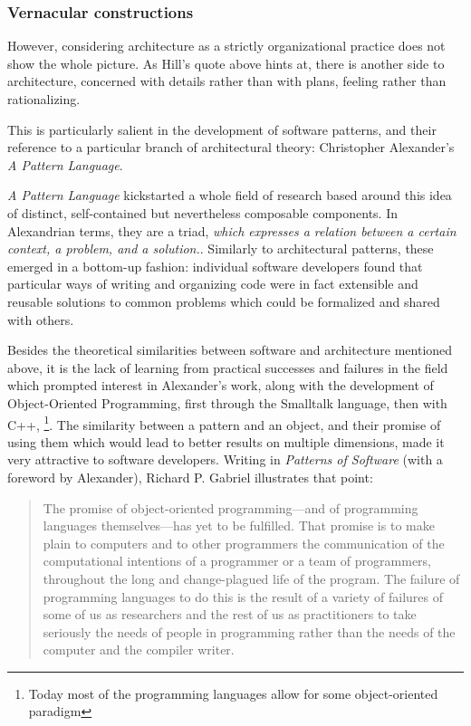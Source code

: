 \subsubsection{Vernacular constructions}

However, considering architecture as a strictly organizational practice does not show the whole picture. As Hill's quote above hints at, there is another side to architecture, concerned with details rather than with plans, feeling rather than rationalizing.

This is particularly salient in the development of software patterns, and their reference to a particular branch of architectural theory: Christopher Alexander's \emph{A Pattern Language}.

\emph{A Pattern Language} kickstarted a whole field of research based around this idea of distinct, self-contained but nevertheless composable components. In Alexandrian terms, they are a triad, \emph{which expresses a relation between a certain context, a problem, and a solution.}. Similarly to architectural patterns, these emerged in a bottom-up fashion: individual software developers found that particular ways of writing and organizing code were in fact extensible and reusable solutions to common problems which could be formalized and shared with others.

Besides the theoretical similarities between software and architecture mentioned above, it is the lack of learning from practical successes and failures in the field which prompted interest in Alexander's work, along with the development of Object-Oriented Programming, first through the Smalltalk language, then with C++, \footnote{Today most of the programming languages allow for some object-oriented paradigm}. The similarity between a pattern and an object, and their promise of using them which would lead to better results on multiple dimensions, made it very attractive to software developers. Writing in \emph{Patterns of Software} (with a foreword by Alexander), Richard P. Gabriel illustrates that point:

\begin{quote}
  The promise of object-oriented programming—and of programming languages themselves—has yet to be fulfilled. That promise is to make plain to computers and to other programmers the communication of the computational intentions of a programmer or a team of programmers, throughout the long and change-plagued life of the program. The failure of programming languages to do this is the result of a variety of failures of some of us as researchers and the rest of us as practitioners to take seriously the needs of people in programming rather than the needs of the computer and the compiler writer. \citep{gabriel_patterns_1998}
\end{quote}

